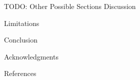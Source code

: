 \documentclass[11pt,twocolumn,a4paper,english]{article}
\begin{document}

\begin{section}{TODO: Other Possible Sections}
	Discussion
	
	Limitations
	
	Conclusion
	
	Acknowledgments
	
	References	
\end{section}




\end{document}
